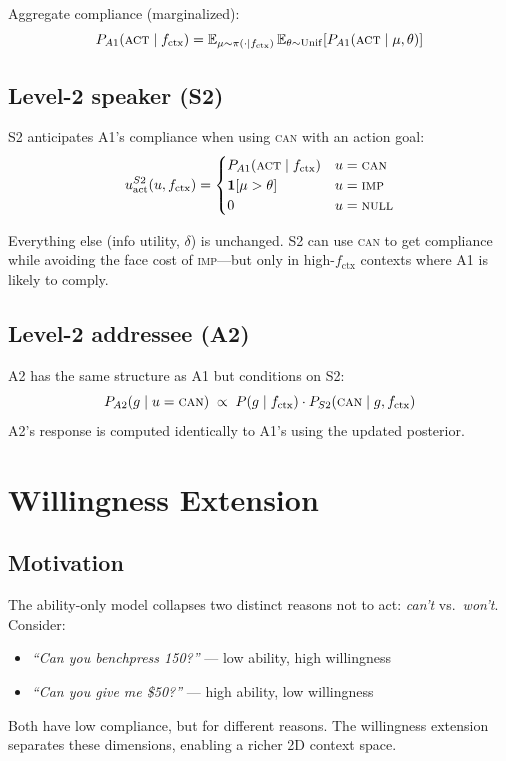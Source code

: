 \documentclass[11pt]{article}
\begin{document}
Aggregate compliance (marginalized):
\[
  P_{A1}(\textsc{act} \mid f_{\text{ctx}}) =
  \mathbb{E}_{\mu \sim \pi(\cdot|f_{\text{ctx}})}\,
  \mathbb{E}_{\theta \sim \mathrm{Unif}}\!\left[P_{A1}(\textsc{act} \mid \mu, \theta)\right]
\]

\subsection{Level-2 speaker (S2)}

S2 anticipates A1's compliance when using \textsc{can} with an action goal:
\[
  u_{\text{act}}^{S2}(u, f_{\text{ctx}}) =
  \begin{cases}
    P_{A1}(\textsc{act} \mid f_{\text{ctx}}) & u = \textsc{can} \\
    \mathbf{1}[\mu > \theta] & u = \textsc{imp} \\
    0 & u = \textsc{null}
  \end{cases}
\]

Everything else (info utility, $\delta$) is unchanged. S2 can use \textsc{can}
to get compliance while avoiding the face cost of \textsc{imp}---but only in
high-$f_{\text{ctx}}$ contexts where A1 is likely to comply.

\subsection{Level-2 addressee (A2)}

A2 has the same structure as A1 but conditions on S2:
\[
  P_{A2}(g \mid u = \textsc{can}) \;\propto\; P(g \mid f_{\text{ctx}})\cdot P_{S2}(\textsc{can} \mid g, f_{\text{ctx}})
\]
A2's response is computed identically to A1's using the updated posterior.

\section{Willingness Extension}
\label{sec:willingness}

\subsection{Motivation}

The ability-only model collapses two distinct reasons not to act: \emph{can't}
vs.\ \emph{won't}. Consider:
\begin{itemize}
  \item \emph{``Can you benchpress 150?''} --- low ability, high willingness
  \item \emph{``Can you give me \$50?''} --- high ability, low willingness
\end{itemize}
Both have low compliance, but for different reasons. The willingness extension
separates these dimensions, enabling a richer 2D context space.
\end{document}
